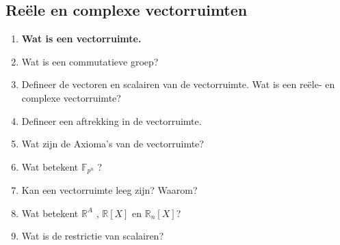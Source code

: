 \documentclass[12pt]{article}
\begin{document}
    \subsection{Reële en complexe vectorruimten}
    \begin{enumerate}
        \item \textbf{Wat is een vectorruimte.}
        \item Wat is een commutatieve groep?
        \item Defineer de vectoren en scalairen van de vectorruimte. Wat is een reële- en complexe vectorruimte?
        \item Defineer een aftrekking in de vectorruimte.
        \item Wat zijn de Axioma's van de vectorruimte? 
        \item Wat betekent $\mathbb{F}_{p^n}$ ?
        \item Kan een vectorruimte leeg zijn? Waarom?
        \item Wat betekent $\mathbb{R}^A$ , $\mathbb{R}[X]$ en $\mathbb{R}_n[X]$? 
        \item Wat is de restrictie van scalairen?
    \end{enumerate}
\end{document}
